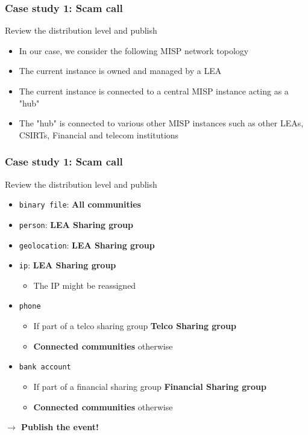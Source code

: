 \begin{frame}
    \frametitle{Case study 1: Scam call}
    Review the distribution level and publish
    \begin{itemize}
        \item In our case, we consider the following MISP network topology
        \item The current instance is owned and managed by a LEA
        \item The current instance is connected to a central MISP instance acting as a "hub"
        \item The "hub" is connected to various other MISP instances such as other LEAs, CSIRTs, Financial and telecom institutions
    \end{itemize}
\end{frame}

\begin{frame}
    \frametitle{Case study 1: Scam call}
    Review the distribution level and publish
    \begin{itemize}
        \item \texttt{binary file}: \textbf{All communities}
        \item \texttt{person}: \textbf{LEA Sharing group}
        \item \texttt{geolocation}: \textbf{LEA Sharing group}
        \item \texttt{ip}: \textbf{LEA Sharing group}
        \begin{itemize}
            \item The IP might be reassigned
        \end{itemize}
        \item \texttt{phone}
        \begin{itemize}
            \item If part of a telco sharing group \textbf{Telco Sharing group}
            \item \textbf{Connected communities} otherwise
        \end{itemize}
        \item \texttt{bank account}
        \begin{itemize}
            \item If part of a financial sharing group \textbf{Financial Sharing group}
            \item \textbf{Connected communities} otherwise
        \end{itemize}
    \end{itemize}
    \begin{center}
        \textbf{$\rightarrow$ Publish the event!}
    \end{center}
\end{frame}


